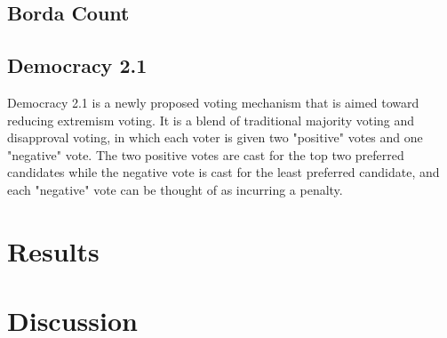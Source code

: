\documentclass[11pt]{article}
\begin{document}
\subsection*{Borda Count}
\subsection*{Democracy 2.1}

Democracy 2.1 is a newly proposed voting mechanism that is aimed toward reducing extremism voting. It is a blend of traditional majority voting and disapproval voting, in which each voter is given two "positive" votes and one "negative" vote. The two positive votes are cast for the top two preferred candidates while the negative vote is cast for the least preferred candidate, and each "negative" vote can be thought of as incurring a penalty.  

\section*{Results}
\section*{Discussion}
\end{document}
